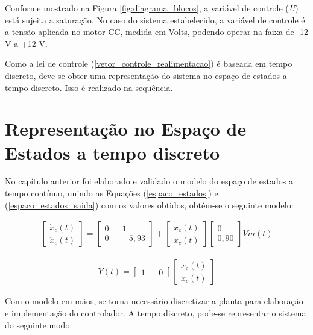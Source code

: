 Conforme mostrado na Figura \ref{fig:diagrama_blocos}, a variável de controle (\textit{U}) está sujeita a saturação. No caso do sistema estabelecido, a variável de controle é a tensão aplicada no motor CC, medida em Volts, podendo operar na faixa de -12 V a +12 V.

Como a lei de controle (\ref{vetor_controle_realimentacao}) é baseada em tempo discreto, deve-se obter uma representação do sistema no espaço de estados a tempo discreto. Isso é realizado na sequência.

\section{Representação no Espaço de Estados a tempo discreto}

No capítulo anterior foi elaborado e validado o modelo do espaço de estados a tempo contínuo, unindo as Equações (\ref{espaco_estados}) e (\ref{espaco_estados_saida}) com os valores obtidos, obtém-se o seguinte modelo:

\begin{gather}
    \begin{bmatrix}
        \dot{x}_c(t) \\ \ddot{x}_c(t)
    \end{bmatrix}=
    \begin{bmatrix}
        0 && 1 \\ 0 && -5,93
    \end{bmatrix}
    +
    \begin{bmatrix}
        x_c(t) \\ \dot{x}_c(t)
    \end{bmatrix}
    \begin{bmatrix}
        0 \\ 0,90
    \end{bmatrix}
    Vm(t)
    \label{espaco_estados1}
\end{gather}

\begin{gather}
    Y(t)=
    \begin{bmatrix}
        1 && 0
    \end{bmatrix}
    \begin{bmatrix}
        x_c(t) \\ \dot{x}_c(t)
    \end{bmatrix}
    \label{espaco_estados_saida1}
\end{gather}

Com o modelo em mãos, se torna necessário discretizar a planta para elaboração e implementação do controlador. A tempo discreto, pode-se representar o sistema do seguinte modo:

